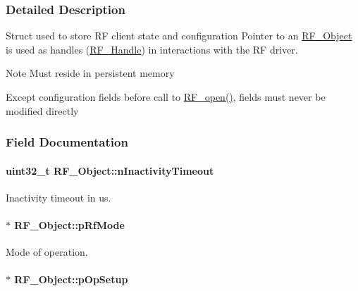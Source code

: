 \subsubsection{Detailed Description}
Struct used to store R\+F client state and configuration Pointer to an \hyperlink{struct_r_f___object}{R\+F\+\_\+\+Object} is used as handles (\hyperlink{_r_f_8h_a5e8ab7fc87fb818f435d9b6226ee573f}{R\+F\+\_\+\+Handle}) in interactions with the R\+F driver. 

\begin{DoxyNote}{Note}
Must reside in persistent memory 

Except configuration fields before call to \hyperlink{_r_f_8h_a13a7c6f5a2b797e0aac18fecfaba6f64}{R\+F\+\_\+open()}, fields must never be modified directly 
\end{DoxyNote}


\subsubsection{Field Documentation}
\paragraph[{n\+Inactivity\+Timeout}]{\setlength{\rightskip}{0pt plus 5cm}uint32\+\_\+t R\+F\+\_\+\+Object\+::n\+Inactivity\+Timeout}\label{struct_r_f___object_acab4c0d923181e985a2867b51f74edcc}


Inactivity timeout in us. 

\paragraph[{p\+Rf\+Mode}]{$\ast$ R\+F\+\_\+\+Object\+::p\+Rf\+Mode}\label{struct_r_f___object_a54a6ee0cde609ca67902a16f9279ca42}


Mode of operation. 

\paragraph[{p\+Op\+Setup}]{$\ast$ R\+F\+\_\+\+Object\+::p\+Op\+Setup}\label{struct_r_f___object_a1a082f0e3e4d1cc3d42438e9c008731a}


